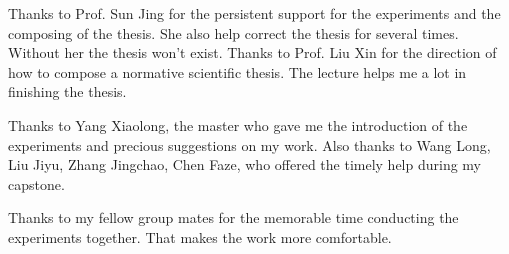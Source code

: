  \setlength{\baselineskip}{20pt}
\begin{thanks}

    Thanks to Prof. Sun Jing for the persistent support for the experiments and the composing of the thesis. She also help correct the thesis for several times. Without her the thesis won’t exist.
    Thanks to Prof. Liu Xin for the direction of how to compose a normative scientific thesis. The lecture helps me a lot in finishing the thesis.

    Thanks to Yang Xiaolong, the master who gave me the introduction of the experiments and precious suggestions on my work. Also thanks to Wang Long, Liu Jiyu, Zhang Jingchao, Chen Faze, who offered the timely help during my capstone.
    
    Thanks to my fellow group mates for the memorable time conducting the experiments together. That makes the work more comfortable.  
    
    
\end{thanks}